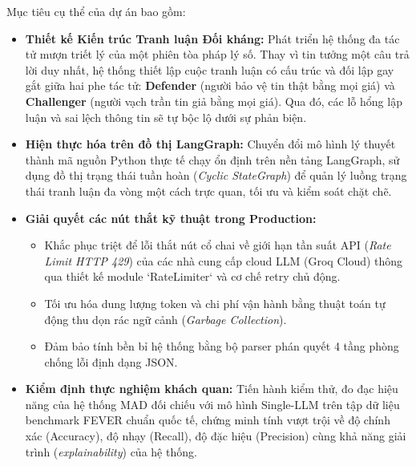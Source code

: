 \documentclass[12pt,a4paper]{report}
\begin{document}
Mục tiêu cụ thể của dự án bao gồm:
\begin{itemize}
    \item \textbf{Thiết kế Kiến trúc Tranh luận Đối kháng:} Phát triển hệ thống đa tác tử mượn triết lý của một phiên tòa pháp lý số. Thay vì tin tưởng một câu trả lời duy nhất, hệ thống thiết lập cuộc tranh luận có cấu trúc và đối lập gay gắt giữa hai phe tác tử: \textbf{Defender} (người bảo vệ tin thật bằng mọi giá) và \textbf{Challenger} (người vạch trần tin giả bằng mọi giá). Qua đó, các lỗ hổng lập luận và sai lệch thông tin sẽ tự bộc lộ dưới sự phản biện.
    \item \textbf{Hiện thực hóa trên đồ thị LangGraph:} Chuyển đổi mô hình lý thuyết thành mã nguồn Python thực tế chạy ổn định trên nền tảng LangGraph, sử dụng đồ thị trạng thái tuần hoàn (\textit{Cyclic StateGraph}) để quản lý luồng trạng thái tranh luận đa vòng một cách trực quan, tối ưu và kiểm soát chặt chẽ.
    \item \textbf{Giải quyết các nút thắt kỹ thuật trong Production:} 
    \begin{itemize}
        \item Khắc phục triệt để lỗi thắt nút cổ chai về giới hạn tần suất API (\textit{Rate Limit HTTP 429}) của các nhà cung cấp cloud LLM (Groq Cloud) thông qua thiết kế module `RateLimiter` và cơ chế retry chủ động.
        \item Tối ưu hóa dung lượng token và chi phí vận hành bằng thuật toán tự động thu dọn rác ngữ cảnh (\textit{Garbage Collection}).
        \item Đảm bảo tính bền bỉ hệ thống bằng bộ parser phán quyết 4 tầng phòng chống lỗi định dạng JSON.
    \end{itemize}
    \item \textbf{Kiểm định thực nghiệm khách quan:} Tiến hành kiểm thử, đo đạc hiệu năng của hệ thống MAD đối chiếu với mô hình Single-LLM trên tập dữ liệu benchmark FEVER chuẩn quốc tế, chứng minh tính vượt trội về độ chính xác (Accuracy), độ nhạy (Recall), độ đặc hiệu (Precision) cùng khả năng giải trình (\textit{explainability}) của hệ thống.
\end{itemize}
\end{document}

